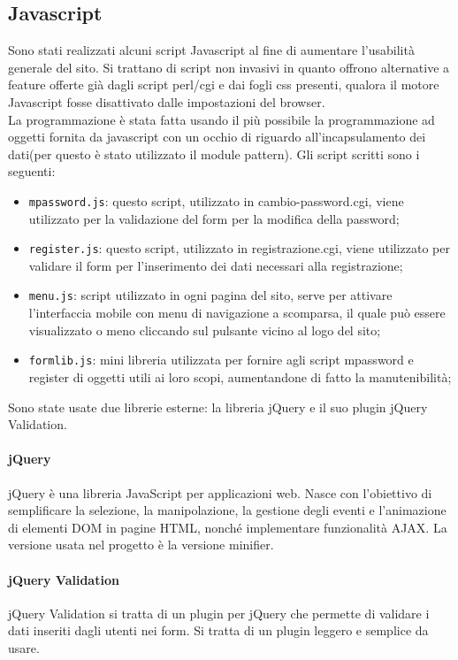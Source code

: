\subsection{Javascript}
Sono stati realizzati alcuni script Javascript al fine di aumentare l'usabilità generale del sito. Si trattano di script non invasivi in quanto offrono alternative a feature offerte già dagli script perl/cgi e dai fogli css presenti, qualora il motore Javascript fosse disattivato dalle impostazioni del browser.\\
La programmazione è stata fatta usando il più possibile la programmazione ad oggetti fornita da javascript con un occhio di riguardo all'incapsulamento dei dati(per questo è stato utilizzato il module pattern).
Gli script scritti sono i seguenti:
\begin{itemize}
	\item \texttt{mpassword.js}: questo script, utilizzato in cambio-password.cgi, viene utilizzato per la validazione del form per la modifica della password;
	\item \texttt{register.js}: questo script, utilizzato in registrazione.cgi, viene utilizzato per validare il form per l'inserimento dei dati necessari alla registrazione;
	\item \texttt{menu.js}: script utilizzato in ogni pagina del sito, serve per attivare l'interfaccia mobile con menu di navigazione a scomparsa, il quale può essere visualizzato o meno cliccando sul pulsante vicino al logo del sito;
	\item \texttt{formlib.js}: mini libreria utilizzata per fornire agli script mpassword e register di oggetti utili ai loro scopi, aumentandone di fatto la manutenibilità;
\end{itemize}
Sono state usate due librerie esterne: la libreria jQuery e il suo plugin jQuery Validation.\\

\paragraph{jQuery}
jQuery è una libreria JavaScript per applicazioni web. Nasce con l'obiettivo di semplificare la selezione, la manipolazione, la gestione degli eventi e l'animazione di elementi DOM in pagine HTML, nonché implementare funzionalità AJAX. La versione usata nel progetto è la versione minifier.

\paragraph{jQuery Validation}
jQuery Validation si tratta di un plugin per jQuery che permette di validare i dati inseriti dagli utenti nei form. Si tratta di un plugin leggero e semplice da usare.

